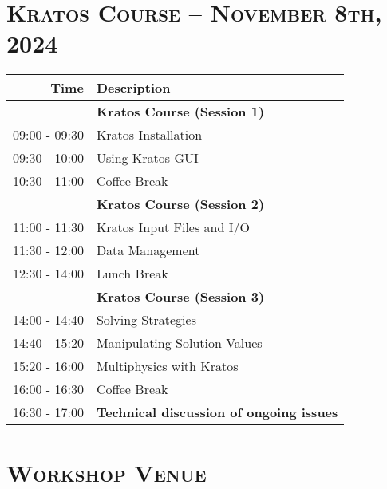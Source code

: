 \documentclass{article}
\begin{document}
\newpage
\section*{\centering \textsc{Kratos Course -- November 8th, 2024}}

\begin{table}[h]\centering
   \begin{tabularx}{0.85\textwidth}{r|X}
      \toprule\rule{0mm}{5mm}
      {\large Time} & {\large Description} \\[1ex]
      \midrule\rule{0mm}{5mm}
                    & {\large \textbf{Kratos Course (Session 1)}} \\[1ex]
      09:00 - 09:30 & Kratos Installation \\[1ex]
      09:30 - 10:00 & Using Kratos GUI \\[1ex]
      \midrule\rule{0mm}{5mm}
      10:30 - 11:00 & Coffee Break \\[1ex]
      \midrule\rule{0mm}{5mm}
                    & {\large \textbf{Kratos Course (Session 2)}} \\[1ex]
      11:00 - 11:30 & Kratos Input Files and I/O \\[1ex]
      11:30 - 12:00 & Data Management \\[1ex]
      \midrule\rule{0mm}{5mm}
      12:30 - 14:00 & Lunch Break \\[1ex]
      \midrule\rule{0mm}{5mm}
                    & {\large \textbf{Kratos Course (Session 3)}} \\[1ex]
      14:00 - 14:40 & Solving Strategies \\[1ex]
      14:40 - 15:20 & Manipulating Solution Values \\[1ex]
      15:20 - 16:00 & Multiphysics with Kratos \\[1ex]
      \midrule\rule{0mm}{5mm}
      16:00 - 16:30 & Coffee Break \\[1ex]
      \midrule\rule{0mm}{5mm}
      16:30 - 17:00 & {\large \textbf{Technical discussion of ongoing issues}} \\[1ex]
      \bottomrule
   \end{tabularx}
\end{table}

\newpage
\section*{\centering \textsc{Workshop Venue}}
\end{document}
